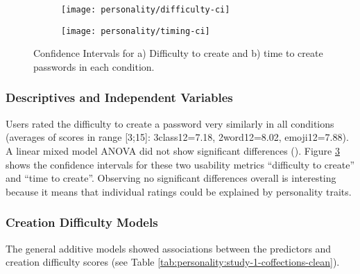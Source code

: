 \begin{figure}[htbp]
	\centering
	\begin{subfigure}[t]{0.49\linewidth}
		\texttt{[image: personality/difficulty-ci]}
		\caption{\label{fig:personality:study-1-difficulty-ci}}
	\end{subfigure}
	\begin{subfigure}[t]{0.49\linewidth}
		\texttt{[image: personality/timing-ci]}
		\caption{\label{fig:personality:study-1-timing-ci}}
	\end{subfigure}
	\caption{\label{fig:personality:study-1-usability-stats}Confidence Intervals for a) Difficulty to create and b) time to create passwords in each condition.}
\end{figure}
\subsubsection{Descriptives and Independent Variables}
Users rated the difficulty to create a password very similarly in all conditions (averages of scores in range [3;15]: 3class12=7.18, 2word12=8.02, emoji12=7.88). A linear mixed model ANOVA did not show significant differences (). Figure \ref{fig:personality:study-1-usability-stats} shows the confidence intervals for these two usability metrics ``difficulty to create'' and ``time to create''. Observing no significant differences overall is interesting because it means that individual ratings could be explained by personality traits. %




\subsubsection{Creation Difficulty Models}
The general additive models showed associations between the predictors and creation difficulty scores (see Table \ref{tab:personality:study-1-coffections-clean}). 

